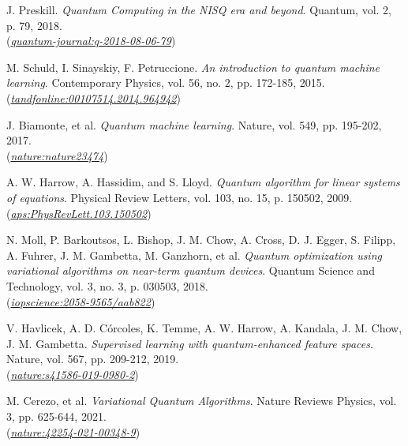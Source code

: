 \documentclass[a4paper]{report}
\begin{document}
\begin{thebibliography}{99}

    J. Preskill. \textit{Quantum Computing in the NISQ era and beyond}. Quantum, vol. 2, p. 79, 2018.\\
    (\href{https://quantum-journal.org/papers/q-2018-08-06-79/} {\textit{quantum-journal:q-2018-08-06-79}})

    M. Schuld, I. Sinayskiy, F. Petruccione. \textit{An introduction to quantum machine learning}. Contemporary Physics, vol. 56, no. 2, pp. 172-185, 2015.\\
    (\href{https://www.tandfonline.com/doi/abs/10.1080/00107514.2014.964942} {\textit{tandfonline:00107514.2014.964942}})

    J. Biamonte, et al. \textit{Quantum machine learning}. Nature, vol. 549, pp. 195-202, 2017.\\
    (\href{https://www.nature.com/articles/nature23474}{\textit{nature:nature23474}})

    A. W. Harrow, A. Hassidim, and S. Lloyd. \textit{Quantum algorithm for linear systems of equations}. Physical Review Letters, vol. 103, no. 15, p. 150502, 2009.\\
    (\href{https://journals.aps.org/prl/abstract/10.1103/PhysRevLett.103.150502} {\textit{aps:PhysRevLett.103.150502}})

    N. Moll, P. Barkoutsos, L. Bishop, J. M. Chow, A. Cross, D. J. Egger, S. Filipp, A. Fuhrer, J. M. Gambetta, M. Ganzhorn, et al. \textit{Quantum optimization using variational algorithms on near-term quantum devices}. Quantum Science and Technology, vol. 3, no. 3, p. 030503, 2018.\\
    (\href{https://iopscience.iop.org/article/10.1088/2058-9565/aab822} {\textit{iopscience:2058-9565/aab822}})

    V. Havlicek, A. D. Córcoles, K. Temme, A. W. Harrow, A. Kandala, J. M. Chow, J. M. Gambetta. \textit{Supervised learning with quantum-enhanced feature spaces}. Nature, vol. 567, pp. 209-212, 2019.\\
    (\href{https://www.nature.com/articles/s41586-019-0980-2}
    {\textit{nature:s41586-019-0980-2}})

    M. Cerezo, et al. \textit{Variational Quantum Algorithms}. Nature Reviews Physics, vol. 3, pp. 625-644, 2021.\\
    (\href{https://www.nature.com/articles/s42254-021-00348-9}{\textit{nature:42254-021-00348-9}})


\end{thebibliography}
\end{document}
